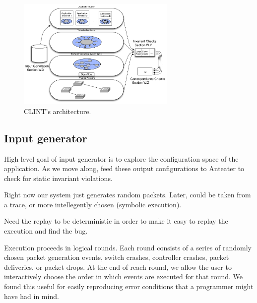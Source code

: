 
\begin{figure}[t]
    \centering
    \includegraphics[width=3in]{../diagrams/architecture/Architecture_simplified.pdf}
    \caption[]{\label{fig:basicarch} CLINT's architecture. \vspace{-10pt}} 
\end{figure}

\subsection{Input generator}

High level goal of input generator is to explore the configuration space of
the application. As we move along, feed these output configurations to
Anteater to check for static invariant violations.


Right now our system just generates random packets. Later, could be taken from a trace, or
more intellegently chosen (\ie symbolic execution).

Need the replay to be deterministic in order to make it easy to replay the execution
and find the bug.

Execution proceeds in logical rounds. Each round consists of a series of
randomly chosen packet generation events, switch crashes, controller crashes,
packet deliveries, or packet drops. At the end of reach round, we allow the user to
interactively choose the order in which events are executed for that round. We
found this useful for easily reproducing error conditions that a programmer
might have had in mind. 

